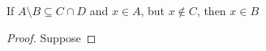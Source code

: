 
\begin{theorem}
  If $A\setminus B \subseteq C \cap D$ and $x \in A$, but $x \notin C$, then $x
  \in B$
\end{theorem}

\begin{proof}
  Suppose
\end{proof}



\begin{align*}
\end{align*}
